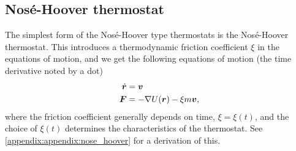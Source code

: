 
\subsection{Nosé-Hoover thermostat}
The simplest form of the Nosé-Hoover type thermostats is the Nosé-Hoover thermostat. This introduces a thermodynamic friction coefficient $\xi$ in the equations of motion, and we get the following equations of motion (the time derivative noted by a dot)
\begin{align}
    \dot {\boldsymbol{r}} &= \boldsymbol{v} \label{eq:nose_hoover_velocity}\\
    \boldsymbol{F} &= -\nabla U(\boldsymbol{r}) - \xi m \boldsymbol{v}, \label{eq:nose_hoover_force}
\end{align}
where the friction coefficient generally depends on time, $\xi = \xi(t)$, and the choice of $\xi(t)$ determines the characteristics of the thermostat. See \cref{appendix:appendix:nose_hoover} for a derivation of this. 

